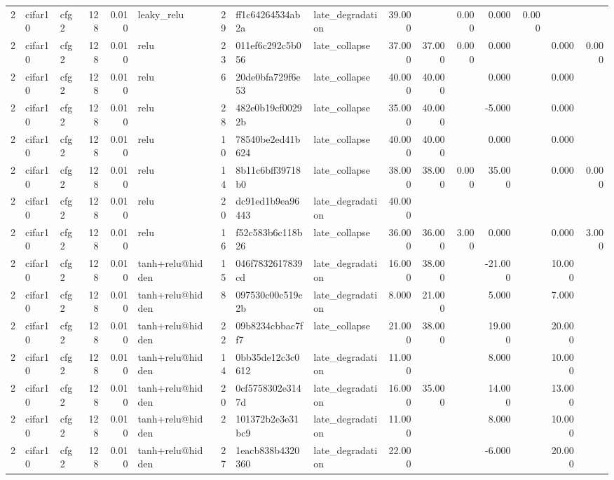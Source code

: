 \begin{table}[htbp]
{\begin{tabular}{@{}rllrrlrllrrrrrrr@{}}
2 & cifar10 & cfg2 & 128 & 0.010 & leaky\_relu & 29 & ff1c64264534ab2a & late\_degradation & 39.000 &  & 0.000 & 0.000 & 0.000 &  &  \\
2 & cifar10 & cfg2 & 128 & 0.010 & relu & 23 & 011ef6c292c5b056 & late\_collapse & 37.000 & 37.000 & 0.000 & 0.000 &  & 0.000 & 0.000 \\
2 & cifar10 & cfg2 & 128 & 0.010 & relu & 6 & 20de0bfa729f6e53 & late\_collapse & 40.000 & 40.000 &  & 0.000 &  & 0.000 &  \\
2 & cifar10 & cfg2 & 128 & 0.010 & relu & 28 & 482e0b19cf00292b & late\_collapse & 35.000 & 40.000 &  & -5.000 &  & 0.000 &  \\
2 & cifar10 & cfg2 & 128 & 0.010 & relu & 10 & 78540be2ed41b624 & late\_collapse & 40.000 & 40.000 &  & 0.000 &  & 0.000 &  \\
2 & cifar10 & cfg2 & 128 & 0.010 & relu & 14 & 8b11c6bff39718b0 & late\_collapse & 38.000 & 38.000 & 0.000 & 35.000 &  & 0.000 & 0.000 \\
2 & cifar10 & cfg2 & 128 & 0.010 & relu & 20 & dc91ed1b9ea96443 & late\_degradation & 40.000 &  &  &  &  &  &  \\
2 & cifar10 & cfg2 & 128 & 0.010 & relu & 16 & f52c583b6c118b26 & late\_collapse & 36.000 & 36.000 & 3.000 & 0.000 &  & 0.000 & 3.000 \\
2 & cifar10 & cfg2 & 128 & 0.010 & tanh+relu@hidden & 15 & 046f7832617839cd & late\_degradation & 16.000 & 38.000 &  & -21.000 &  & 10.000 &  \\
2 & cifar10 & cfg2 & 128 & 0.010 & tanh+relu@hidden & 8 & 097530c00c519c2b & late\_degradation & 8.000 & 21.000 &  & 5.000 &  & 7.000 &  \\
2 & cifar10 & cfg2 & 128 & 0.010 & tanh+relu@hidden & 22 & 09b8234cbbac7ff7 & late\_collapse & 21.000 & 38.000 &  & 19.000 &  & 20.000 &  \\
2 & cifar10 & cfg2 & 128 & 0.010 & tanh+relu@hidden & 14 & 0bb35de12c3c0612 & late\_degradation & 11.000 &  &  & 8.000 &  & 10.000 &  \\
2 & cifar10 & cfg2 & 128 & 0.010 & tanh+relu@hidden & 20 & 0cf5758302e3147d & late\_degradation & 16.000 & 35.000 &  & 14.000 &  & 13.000 &  \\
2 & cifar10 & cfg2 & 128 & 0.010 & tanh+relu@hidden & 2 & 101372b2e3e31bc9 & late\_degradation & 11.000 &  &  & 8.000 &  & 10.000 &  \\
2 & cifar10 & cfg2 & 128 & 0.010 & tanh+relu@hidden & 27 & 1eacb838b4320360 & late\_degradation & 22.000 &  &  & -6.000 &  & 20.000 &  \\

\end{tabular}}
\end{table}
